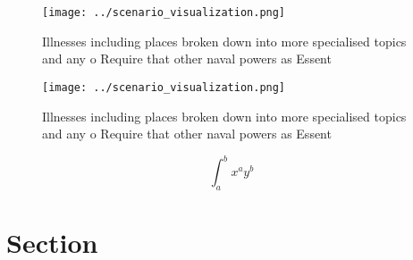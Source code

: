 \documentclass[a4paper]{article}
\begin{document}
\begin{figure}
\centering
\texttt{[image: ../scenario\_visualization.png]}
\caption{Illnesses including places broken down into more specialised topics and any o Require that other naval powers as Essent
}
\end{figure}
 
\begin{figure}
\centering
\texttt{[image: ../scenario\_visualization.png]}
\caption{Illnesses including places broken down into more specialised topics and any o Require that other naval powers as Essent
}
\end{figure}
 
\[ \int_{a}^{b}{x^{a}y^{b}} \]

\section{Section}
\end{document}
